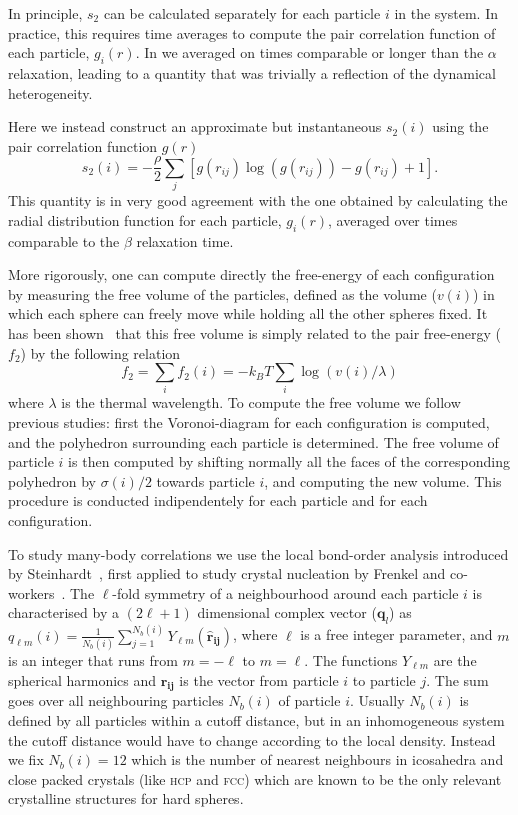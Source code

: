 \documentclass[twocolumn,superscriptaddress]{revtex4-1}
\begin{document}
In principle, $s_2$ can be calculated separately for each particle $i$ in the system. In practice, this requires time averages to compute the pair correlation function of each particle, $g_i(r)$. In \cite{tanaka} we averaged on times comparable or longer than the $\alpha$ relaxation, leading to a quantity that was trivially a reflection of the dynamical heterogeneity. 

Here we instead construct an approximate but instantaneous $s_2(i)$ using the pair correlation function $g(r)$
\begin{equation}
s_2(i) = -\frac{\rho}{2}\sum_j \left[g(r_{ij})\log(g(r_{ij}))-g(r_{ij})+1\right].
\end{equation}
This quantity is in very good agreement with the one obtained by calculating the radial distribution function for each
particle, $g_i(r)$, averaged over times comparable to the $\beta$ relaxation time.

More rigorously, one can compute directly the free-energy of each configuration by
measuring the free volume of the particles, defined as the volume ($v(i)$) in which each sphere can freely
move while holding all the other spheres fixed. It has been shown~\cite{Aste2004} that this free
volume is simply related to the pair free-energy ($f_2$) by the following relation
\begin{equation}
f_2=\sum_i f_2(i)=-k_BT\sum_i \log(v(i)/\lambda)
\end{equation}
where $\lambda$ is the thermal wavelength. To compute the free volume we follow previous
studies: first the Voronoi-diagram for each configuration is computed, and the polyhedron
surrounding each particle is determined. The free volume of particle $i$ is then
computed by shifting normally all the faces of the corresponding polyhedron by $\sigma(i)/2$
towards particle $i$, and computing the new volume. This procedure is conducted indipendentely
for each particle and for each configuration.

To study many-body correlations we use the local bond-order analysis introduced by
Steinhardt~\cite{steinhardt}, first applied to study crystal nucleation by
Frenkel and co-workers~\cite{auer}. 
The $\ell$-fold symmetry of a neighbourhood around each particle $i$ is characterised by a $(2\ell+1)$ dimensional complex vector ($\mathbf{q}_l$) as $q_{\ell m}(i)=\frac{1}{N_b(i)}\sum_{j=1}^{N_b(i)} Y_{\ell m}(\mathbf{\hat{r}_{ij}})$, where
$\ell$ is a free integer parameter, and $m$ is an integer
that runs from $m=-\ell$ to $m=\ell$. The functions $Y_{\ell m}$ are the spherical harmonics
and $\mathbf{\hat{r}_{ij}}$ is the vector from particle $i$ to particle $j$.
The sum goes over all neighbouring particles $N_b(i)$ of particle $i$. Usually 
$N_b(i)$ is defined by all particles within a cutoff distance, but in an inhomogeneous system
the cutoff distance would have to change according to the local density. Instead we 
fix $N_b(i)=12$ which is the number of nearest neighbours in icosahedra and close packed crystals (like \textsc{hcp} and \textsc{fcc})
which are known to be the only relevant crystalline structures for hard spheres.
\end{document}

